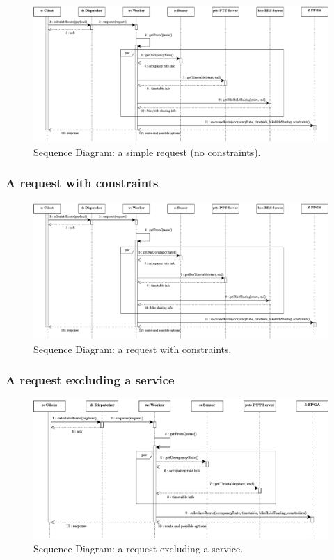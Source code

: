 \documentclass[a4paper]{article}
\begin{document}
    \begin{figure}[!htp]
        \centering
        \includegraphics[width=\textwidth]{img/sequence-diagram-1.pdf}
        \caption{Sequence Diagram: a simple request (no constraints).}
    \end{figure}

    \newpage

    \subsubsection*{A request with constraints}

    \begin{figure}[!htp]
        \centering
        \includegraphics[width=\textwidth]{img/sequence-diagram-2.pdf}
        \caption{Sequence Diagram: a request with constraints.}
    \end{figure}

    \newpage

    \subsubsection*{A request excluding a service}

    \begin{figure}[!htp]
        \centering
        \includegraphics[width=\textwidth]{img/sequence-diagram-3.pdf}
        \caption{Sequence Diagram: a request excluding a service.}
    \end{figure}
\end{document}
